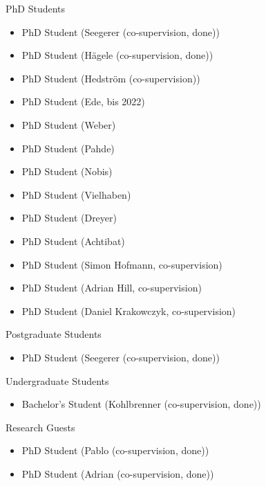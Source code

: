 
\headedsection 
{PhD Students}
{
    \begin{itemize}
        \item [] PhD Student (Seegerer (co-supervision, done))
        \item [] PhD Student (Hägele (co-supervision, done))
        \item [] PhD Student (Hedström (co-supervision))
        \item [] PhD Student (Ede, bis 2022)
        \item [] PhD Student (Weber)
        \item [] PhD Student (Pahde)
        \item [] PhD Student (Nobis)
        \item [] PhD Student (Vielhaben)
        \item [] PhD Student (Dreyer)
        \item [] PhD Student (Achtibat)
        \item [] PhD Student (Simon Hofmann, co-supervision)
        \item [] PhD Student (Adrian Hill, co-supervision)
        \item [] PhD Student (Daniel Krakowczyk, co-supervision)
    \end{itemize}
}

\headedsection 
{Postgraduate Students}
{
    \begin{itemize}
        \item [] PhD Student (Seegerer (co-supervision, done))
    \end{itemize}
}

\headedsection 
{Undergraduate Students}
{
    \begin{itemize}
        \item [] Bachelor's Student (Kohlbrenner (co-supervision, done))
    \end{itemize}
}

\headedsection 
{Research Guests}
{
    \begin{itemize}
        \item [] PhD Student (Pablo (co-supervision, done))
        \item [] PhD Student (Adrian (co-supervision, done))
    \end{itemize}
}

